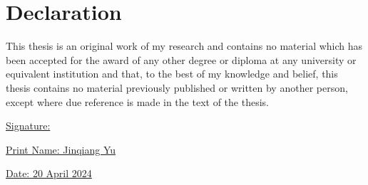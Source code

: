 
\section*{Declaration}

This thesis is an original work of my research and contains no material which has been accepted for the award of any other degree or diploma at any university or equivalent institution and that, to the best of my knowledge and belief, this thesis contains no material previously published or written by another person, except where due reference is made in the text of the thesis.

\vspace{48pt}
\underline{Signature: \hspace{11em}}

\vspace{24pt}
\underline{Print Name: Jinqiang Yu\hspace{4.8em}}

\vspace{24pt}
\underline{Date: 20 April 2024\hspace{7.2em}}


